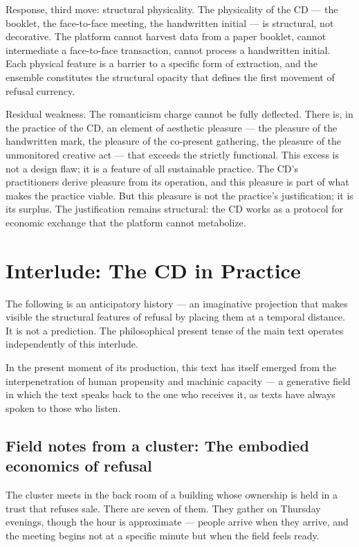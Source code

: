 Response, third move: structural physicality. The physicality of the CD — the booklet, the face-to-face meeting, the handwritten initial — is structural, not decorative. The platform cannot harvest data from a paper booklet, cannot intermediate a face-to-face transaction, cannot process a handwritten initial. Each physical feature is a barrier to a specific form of extraction, and the ensemble constitutes the structural opacity that defines the first movement of refusal currency.

Residual weakness. The romanticism charge cannot be fully deflected. There is, in the practice of the CD, an element of aesthetic pleasure — the pleasure of the handwritten mark, the pleasure of the co-present gathering, the pleasure of the unmonitored creative act — that exceeds the strictly functional. This excess is not a design flaw; it is a feature of all sustainable practice. The CD's practitioners derive pleasure from its operation, and this pleasure is part of what makes the practice viable. But this pleasure is not the practice's justification; it is its surplus. The justification remains structural: the CD works as a protocol for economic exchange that the platform cannot metabolize.

\section{Interlude: The CD in Practice}

The following is an anticipatory history — an imaginative projection that makes visible the structural features of refusal by placing them at a temporal distance. It is not a prediction. The philosophical present tense of the main text operates independently of this interlude.

In the present moment of its production, this text has itself emerged from the interpenetration of human propensity and machinic capacity — a generative field in which the text speaks back to the one who receives it, as texts have always spoken to those who listen.

\subsection{Field notes from a cluster: The embodied economics of refusal}

The cluster meets in the back room of a building whose ownership is held in a trust that refuses sale. There are seven of them. They gather on Thursday evenings, though the hour is approximate — people arrive when they arrive, and the meeting begins not at a specific minute but when the field feels ready.

